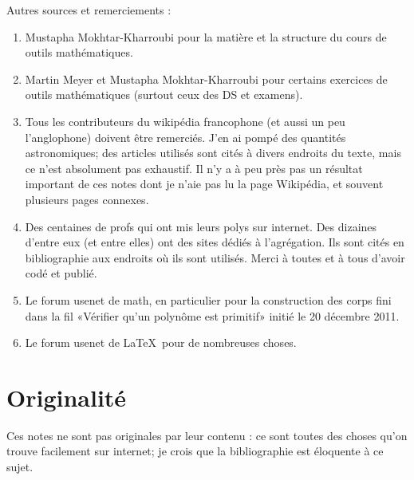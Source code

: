 Autres sources et remerciements :
\begin{enumerate}
    \item
        Mustapha Mokhtar-Kharroubi pour la matière et la structure du cours de outils mathématiques.
    \item
        Martin Meyer et Mustapha Mokhtar-Kharroubi pour certains exercices de outils mathématiques (surtout ceux des DS et examens).
    \item
        Tous les contributeurs du wikipédia francophone (et aussi un peu l'anglophone) doivent être remerciés. J'en ai pompé des quantités astronomiques; des articles utilisés sont cités à divers endroits du texte, mais ce n'est absolument pas exhaustif. Il n'y a à peu près pas un résultat important de ces notes dont je n'aie pas lu la page Wikipédia, et souvent plusieurs pages connexes.
    \item
        Des centaines de profs qui ont mis leurs polys sur internet. Des dizaines d'entre eux (et entre elles) ont des sites dédiés à l'agrégation. Ils sont cités en bibliographie aux endroits où ils sont utilisés. Merci à toutes et à tous d'avoir codé et publié.

    \item
        Le forum usenet de math, en particulier pour la construction des corps fini dans la fil «Vérifier qu'un polynôme est primitif» initié le 20 décembre 2011.
    \item
        Le forum usenet de \LaTeX\ pour de nombreuses choses.
\end{enumerate}


\section*{Originalité}

Ces notes ne sont pas originales par leur contenu : ce sont toutes des choses qu'on trouve facilement sur internet; je crois que la bibliographie est éloquente à ce sujet.


